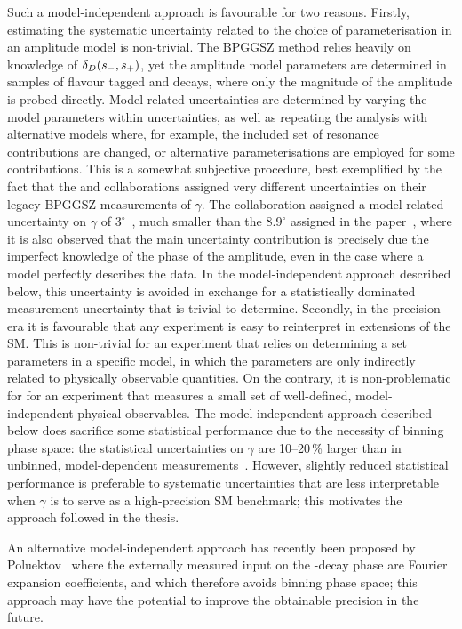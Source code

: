 Such a model-independent approach is favourable for two reasons. Firstly, estimating the systematic uncertainty related to the choice of parameterisation in an amplitude model is non-trivial. The BPGGSZ method relies heavily on knowledge of $\delta_D(s_-, s_+)$, yet the amplitude model parameters are determined in samples of flavour tagged \Dz and \Dzb decays, where only the magnitude of the amplitude is probed directly. Model-related uncertainties are determined by varying the model parameters within uncertainties, as well as repeating the analysis with alternative models where, for example, the included set of resonance contributions are changed, or alternative parameterisations are employed for some contributions. This is a somewhat subjective procedure, best exemplified by the fact that the \babar and \belle collaborations assigned very different uncertainties on their legacy BPGGSZ measurements of $\gamma$. The \babar collaboration assigned a model-related uncertainty on $\gamma$ of $3^\circ$~\cite{BABAR2010}, much smaller than the $8.9^\circ$ assigned in the \belle paper~\cite{BELLE2010}, where it is also observed that the main uncertainty contribution is precisely due the imperfect knowledge of the phase of the amplitude, even in the case where a model perfectly describes the data. In the model-independent approach described below, this uncertainty is avoided in exchange for a statistically dominated measurement uncertainty that is trivial to determine. 
Secondly, in the precision era it is favourable that any experiment is easy to reinterpret in  extensions of the SM. This is non-trivial for an experiment that relies on determining a set parameters in a specific model, in which the parameters are only indirectly related to physically observable quantities. On the contrary, it is non-problematic for for an experiment that measures a small set of well-defined, model-independent physical observables. The model-independent approach described below does sacrifice some statistical performance due to the necessity of binning phase space: the statistical uncertainties on $\gamma$ are 10--20\,\% larger than in unbinned, model-dependent measurements~\cite{CLEOCISI}. However, slightly reduced statistical performance is preferable to systematic uncertainties that are less interpretable when $\gamma$ is to serve as a high-precision SM benchmark; this motivates the approach followed in the thesis.

An alternative model-independent approach has recently been proposed by Poluektov~\cite{poluektovUnbinnedModelindependentMeasurements2018} where the externally measured input on the \D-decay phase are Fourier expansion coefficients, and which therefore avoids binning phase space; this approach may have the potential to improve the obtainable precision in the future.



